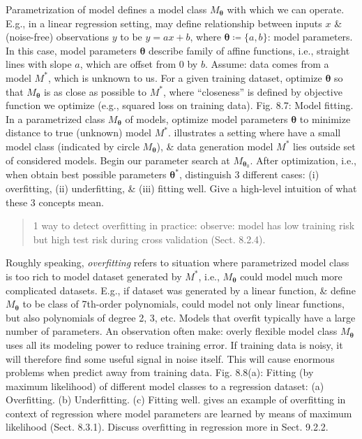 \documentclass{article}
\begin{document}
\begin{itemize}
\begin{itemize}
\begin{itemize}
			Parametrization of model defines a model class $M_{\boldsymbol{\theta}}$ with which we can operate. E.g., in a linear regression setting, may define relationship between inputs $x$ \& (noise-free) observations $y$ to be $y = ax + b$, where $\boldsymbol{\theta}\coloneqq\{a,b\}$: model parameters. In this case, model parameters $\boldsymbol{\theta}$ describe family of affine functions, i.e., straight lines with slope $a$, which are offset from 0 by $b$. Assume: data comes from a model $M^*$, which is unknown to us. For a given training dataset, optimize $\boldsymbol{\theta}$ so that $M_{\boldsymbol{\theta}}$ is as close as possible to $M^*$, where ``closeness'' is defined by objective function we optimize (e.g., squared loss on training data). {\sf Fig. 8.7: Model fitting. In a parametrized class $M_{\boldsymbol{\theta}}$ of models, optimize model parameters $\boldsymbol{\theta}$ to minimize distance to true (unknown) model $M^*$.} illustrates a setting where have a small model class (indicated by circle $M_{\boldsymbol{\theta}}$), \& data generation model $M^*$ lies outside set of considered models. Begin our parameter search at $M_{\boldsymbol{\theta}_0}$. After optimization, i.e., when obtain best possible parameters $\boldsymbol{\theta}^*$, distinguish 3 different cases: (i) overfitting, (ii) underfitting, \& (iii) fitting well. Give a high-level intuition of what these 3 concepts mean.
			\begin{quote}
				1 way to detect overfitting in practice: observe: model has low training risk but high test risk during cross validation (Sect. 8.2.4).
			\end{quote}
			Roughly speaking, {\it overfitting} refers to situation where parametrized model class is too rich to model dataset generated by $M^*$, i.e., $M_{\boldsymbol{\theta}}$ could model much more complicated datasets. E.g., if dataset was generated by a linear function, \& define $M_{\boldsymbol{\theta}}$ to be class of 7th-order polynomials, could model not only linear functions, but also polynomials of degree 2, 3, etc. Models that overfit typically have a large number of parameters. An observation often make: overly flexible model class $M_{\boldsymbol{\theta}}$ uses all its modeling power to reduce training error. If training data is noisy, it will therefore find some useful signal in noise itself. This will cause enormous problems when predict away from training data. {\sf Fig. 8.8(a): Fitting (by maximum likelihood) of different model classes to a regression dataset: (a) Overfitting. (b) Underfitting. (c) Fitting well.} gives an example of overfitting in context of regression where model parameters are learned by means of maximum likelihood (Sect. 8.3.1). Discuss overfitting in regression more in Sect. 9.2.2.
			

\end{itemize}
\end{itemize}
\end{itemize}
\end{document}
